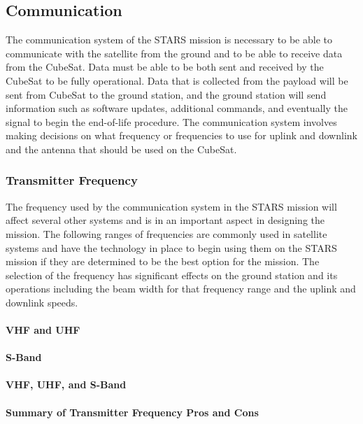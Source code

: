 \documentclass{ece}
\begin{document}
\subsection{Communication}
The communication system of the STARS mission is necessary to be able to communicate with the satellite from the ground and to be able to receive data from the CubeSat. Data must be able to be both sent and received by the CubeSat to be fully operational. Data that is collected from the payload will be sent from CubeSat to the ground station, and the ground station will send information such as software updates, additional commands, and eventually the signal to begin the end-of-life procedure. The communication system involves making decisions on what frequency or frequencies to use for uplink and downlink and the antenna that should be used on the CubeSat. 

\subsubsection{Transmitter Frequency}
The frequency used by the communication system in the STARS mission will affect several other systems and is in an important aspect in designing the mission. The following ranges of frequencies are commonly used in satellite systems and have the technology in place to begin using them on the STARS mission if they are determined to be the best option for the mission. The selection of the frequency has significant effects on the ground station and its operations including the beam width for that frequency range and the uplink and downlink speeds. 

\paragraph{VHF and UHF}


\paragraph{S-Band}
\paragraph{VHF, UHF, and S-Band}
\paragraph{Summary of Transmitter Frequency Pros and Cons}
\end{document}
